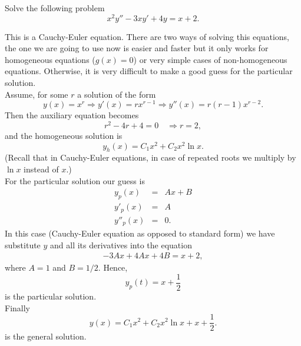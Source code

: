 \documentclass[11pt]{article}
\begin{document}
\begin{problem}
Solve the following problem
\begin{equation*}
     x^{2}y''-3xy'+4y=x+2.
\end{equation*}
\end{problem}
\begin{solution}
This is a Cauchy-Euler equation. There are two ways of solving this equations, the one we are going to use now is easier and faster but it only works for homogeneous equations ($g(x)=0$) or very simple cases of non-homogeneous equations. Otherwise, it is very difficult to make a good guess for the particular solution.\\
Assume, for some $r$ a solution of the form 
\[y(x)=x^{r}\Rightarrow y'(x)=rx^{r-1}\Rightarrow y''(x)=r(r-1)x^{r-2}.\]
Then the auxiliary equation becomes
\[r^{2}-4r+4=0 \quad \Rightarrow r = 2,\]
and the homogeneous solution is
\[y_{h}(x)=C_{1}x^{2}+C_{2}x^{2}\ln x.\]
(Recall that in Cauchy-Euler equations, in case of repeated roots we multiply by $\ln x$ instead of $x$.)\\
For the particular solution our guess is
\begin{eqnarray*}
y_{p}(x) & = & Ax + B \\
y'_{p}(x) & = & A \\
y''_{p}(x) & = & 0.
\end{eqnarray*}
In this case (Cauchy-Euler equation as opposed to standard form) we have substitute $y$ and all its derivatives into the equation 
\begin{equation*} \begin{split}
 -3Ax + 4 A x +4B = x+2,
\end{split}
\end{equation*}
where $A=1$ and $B =1/2$. Hence, 
$$y_{p}(t) = x + \frac{1}{2}$$ 
is the particular solution.\\
Finally 
\[\boxed{y(x)=C_{1} x^{2}+ C_{2}x^{2}\ln x + x +\frac{1}{2}}.\]
is the general solution.
\end{solution}
\end{document}
